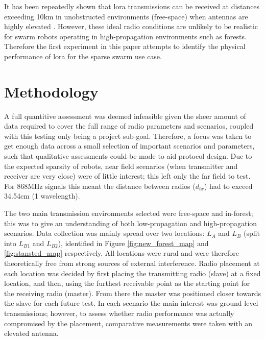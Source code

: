 It has been repeatedly shown that \ac{lora} transmissions can be received at distances exceeding 10km in  unobstructed environments (free-space) when antennas are highly elevated \cite{3YP:LORA_RANGE_REVIEW}. However, these ideal radio conditions are unlikely to be realistic for swarm robots operating in high-propagation environments such as forests. Therefore the first experiment in this paper attempts to identify the physical performance of \ac{lora} for the sparse swarm use case. 

\section{Methodology}
A full quantitive assessment was deemed infeasible given the sheer amount of data required to cover the full range of radio parameters and scenarios, coupled with this testing only being a project sub-goal. Therefore, a focus was taken to get enough data across a small selection of important scenarios and parameters, such that qualitative assessments could be made to aid protocol design. Due to the expected sparsity of robots, near field scenarios (when transmitter and receiver are very close) were of little interest; this left only the far field to test. For 868MHz signals this meant the distance between radios ($d_{tx}$) had to exceed 34.54cm (1 wavelength). 

 The two main transmission environments selected were free-space and in-forest; this was to give an understanding of both low-propagation and high-propagation scenarios. Data collection was mainly spread over two locations: \textbf{$L_{A}$} and \textbf{$L_{B}$} (split into \textbf{$L_{B1}$} and \textbf{$L_{B2}$}), identified in Figure \ref{fig:new_forest_map} and \ref{fig:stansted_map} respectively. All locations were rural and were therefore theoretically free from strong sources of external interference. Radio placement at each location was decided by first placing the transmitting radio (slave) at a fixed location, and then, using the furthest receivable point as the starting point for the receiving radio (master). From there the master was positioned closer towards the slave for each future test. In each scenario the main interest was ground level transmissions; however, to assess whether radio performance was actually compromised by the placement, comparative measurements were taken with an elevated antenna. 
 
